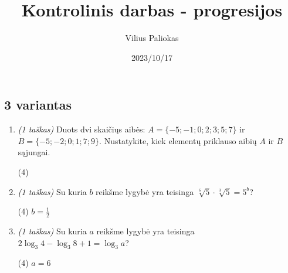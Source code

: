 \documentclass[a4paper]{article}
\title{Kontrolinis darbas - progresijos}
\author{Vilius Paliokas}
\date{2023/10/17}
\begin{document}
\thispagestyle{fancy}

\titlespacing*{\subsection}{0pt}{.75ex}{0.75ex}

\subsection*{3 variantas}

\begin{enumerate}
      \item \textit{(1 taškas)} Duots dvi skaičiųs aibės: $A=\{-5; -1; 0; 2; 3;
                  5; 7\}$ ir $B=\{-5; -2; 0; 1; 7; 9\}$. Nustatykite, kiek
            elementų priklauso aibių
            $A$ ir $B$ sąjungai.
            \begin{tasks}[item-format={\normalfont}, after-item-skip=2mm,
                        label=\Alph*, label-format={\bfseries}](4)
            \end{tasks}

      \item \textit{(1 taškas)} Su kuria $b$ reikšme lygybė yra teisinga
            $\sqrt[6]{5}\cdot\sqrt[3]{5}=5^b$?
            \begin{tasks}[item-format={\normalfont}, after-item-skip=2mm,
                        label=\Alph*, label-format={\bfseries}](4)
                  \task $b=\frac{1}{2}$
            \end{tasks}

      \item \textit{(1 taškas)} Su kuria $a$ reikšme lygybė yra teisinga
            $2\log_{3} 4-\log_{3} 8 + 1 = \log_{3} a$?
            \begin{tasks}[item-format={\normalfont}, after-item-skip=2mm,
                        label=\Alph*, label-format={\bfseries}](4)
                  \task $a=6$
            \end{tasks}


\end{enumerate}
\end{document}
